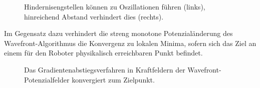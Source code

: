 \begin{figure}[H]
\begin{minipage}{0.46\textwidth}
		\centerline{}
	\end{minipage}
	\hspace*{\fill}
	\label{fig:oscillation}
	\caption{Hindernisengstellen können zu Oszillationen führen (links), hinreichend Abstand verhindert dies (rechts).}
\end{figure}

Im Gegensatz dazu verhindert die streng monotone Potenzialänderung des Wavefront-Algorithmus die Konvergenz zu lokalen Minima, sofern sich das Ziel an einem für den Roboter physikalisch erreichbaren Punkt befindet.
\vspace*{0.1cm}
\begin{figure}[H]
	\footnotesize
	\centering
	\centerline{}
	\caption{Das Gradientenabstiegsverfahren in Kraftfeldern der Wavefront-Potenzialfelder konvergiert zum Zielpunkt.}
\end{figure}

